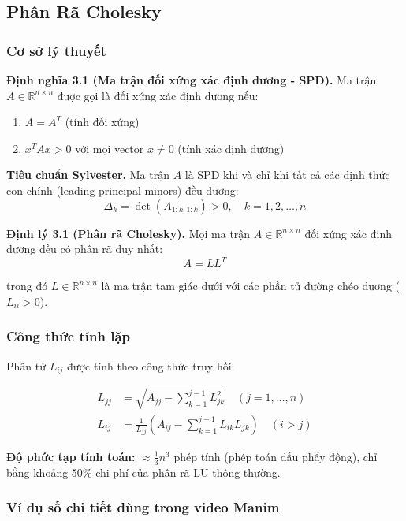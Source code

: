 \documentclass[a4paper]{article}
\begin{document}
\subsection{Phân Rã Cholesky}

\subsubsection{Cơ sở lý thuyết}

\textbf{Định nghĩa 3.1 (Ma trận đối xứng xác định dương - SPD).} Ma trận $A \in \mathbb{R}^{n \times n}$ được gọi là đối xứng xác định dương nếu:
\begin{enumerate}
    \item $A = A^T$ (tính đối xứng)
    \item $x^T A x > 0$ với mọi vector $x \neq 0$ (tính xác định dương)
\end{enumerate}

\textbf{Tiêu chuẩn Sylvester.} Ma trận $A$ là SPD khi và chỉ khi tất cả các định thức con chính (leading principal minors) đều dương:
$$\Delta_k = \det(A_{1:k, 1:k}) > 0, \quad k = 1, 2, \ldots, n$$

\textbf{Định lý 3.1 (Phân rã Cholesky).} Mọi ma trận $A \in \mathbb{R}^{n \times n}$ đối xứng xác định dương đều có phân rã duy nhất:
$$A = LL^T$$

trong đó $L \in \mathbb{R}^{n \times n}$ là ma trận tam giác dưới với các phần tử đường chéo dương ($L_{ii} > 0$).

\subsubsection{Công thức tính lặp}

Phân tử $L_{ij}$ được tính theo công thức truy hồi:

\begin{align}
    L_{jj} &= \sqrt{A_{jj} - \sum_{k=1}^{j-1} L_{jk}^2} \quad (j = 1, \ldots, n)\\
    L_{ij} &= \frac{1}{L_{jj}} \left( A_{ij} - \sum_{k=1}^{j-1} L_{ik}L_{jk} \right) \quad (i > j)
\end{align}

\textbf{Độ phức tạp tính toán:} $\approx \frac{1}{3}n^3$ phép tính (phép toán dấu phẩy động), chỉ bằng khoảng 50\% chi phí của phân rã LU thông thường.

\subsubsection{Ví dụ số chi tiết dùng trong video Manim}
\end{document}
